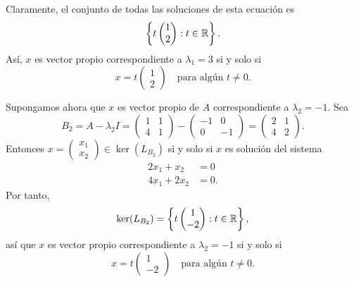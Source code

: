 \documentclass[12pt,a4paper]{book}
\begin{document}
\begin{ejemplo}
\begin{equation*}
        \end{equation*}
        Claramente, el conjunto de todas las soluciones de esta ecuación es
        \begin{equation*}
            \left\{ t\begin{pmatrix} 1 \\ 2 \end{pmatrix} : t \in \mathbb{R} \right\}.
        \end{equation*}
        Así, $x$ es vector propio correspondiente a $\lambda_1 = 3$ si y solo si
        \begin{equation*}
            x = t \begin{pmatrix} 1 \\ 2 \end{pmatrix} \quad \text{para algún } t \neq 0.
        \end{equation*}

        Supongamos ahora que $x$ es vector propio de $A$ correspondiente a $\lambda_2 = -1$. Sea
        \begin{equation*}
            B_2 = A - \lambda_2 I = \begin{pmatrix} 1 & 1 \\ 4 & 1 \end{pmatrix} - \begin{pmatrix} -1 & 0 \\ 0 & -1 \end{pmatrix} = \begin{pmatrix} 2 & 1 \\ 4 & 2 \end{pmatrix}.
        \end{equation*}
        Entonces $x = \begin{pmatrix} x_1 \\ x_2 \end{pmatrix} \in \ker(L_{B_2})$ si y solo si $x$ es solución del sistema
        \begin{align*}
            2x_1 + x_2 &= 0 \\
            4x_1 + 2x_2 &= 0.
        \end{align*}
        Por tanto,
        \begin{equation*}
            \ker(L_{B_2}) = \left\{ t\begin{pmatrix} 1 \\ -2 \end{pmatrix} : t \in \mathbb{R} \right\},
        \end{equation*}
        así que $x$ es vector propio correspondiente a $\lambda_2 = -1$ si y solo si
        \begin{equation*}
            x = t \begin{pmatrix} 1 \\ -2 \end{pmatrix} \quad \text{para algún } t \neq 0.
        \end{equation*}


\end{ejemplo}
\end{document}

